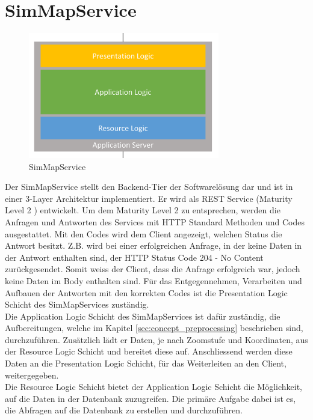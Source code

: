 \section{SimMapService}
\begin{figure}[H]
\centering
\includegraphics[height=5.5cm]{images/BusinessLogicLayer.png}
\caption{SimMapService}
\label{fig:businesslogiclayer}
\end{figure}
\noindent
Der SimMapService stellt den Backend-Tier der Softwarelösung dar und ist in einer 3-Layer Architektur implementiert. Er wird als REST Service (Maturity Level 2 \cite{RESTMaturity}) entwickelt. Um dem Maturity Level 2 zu entsprechen, werden die Anfragen und Antworten des Services mit HTTP Standard Methoden und Codes ausgestattet. Mit den Codes wird dem Client angezeigt, welchen Status die Antwort besitzt. Z.B. wird bei einer erfolgreichen Anfrage, in der keine Daten in der Antwort enthalten sind, der HTTP Status Code \glqq{}204 - No Content\grqq{} zurückgesendet. Somit weiss der Client, dass die Anfrage erfolgreich war, jedoch keine Daten im Body enthalten sind. Für das Entgegennehmen, Verarbeiten und Aufbauen der Antworten mit den korrekten Codes ist die Presentation Logic Schicht des SimMapServices zuständig.\\
Die Application Logic Schicht des SimMapServices ist dafür zuständig, die Aufbereitungen, welche im Kapitel \ref{sec:concept_preprocessing}  beschrieben sind, durchzuführen. Zusätzlich lädt er Daten, je nach Zoomstufe und Koordinaten, aus der Resource Logic Schicht und bereitet diese auf. Anschliessend werden diese Daten an die Presentation Logic Schicht, für das Weiterleiten an den Client, weitergegeben.\\
Die Resource Logic Schicht bietet der Application Logic Schicht die Möglichkeit, auf die Daten in der Datenbank zuzugreifen. Die primäre Aufgabe dabei ist es, die Abfragen auf die Datenbank zu erstellen und durchzuführen.
